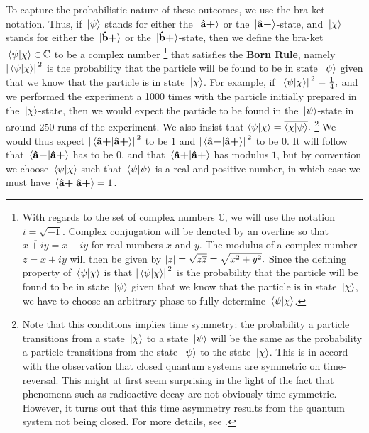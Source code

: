 \documentclass[letter, 12pt]{turabian-thesis}
\theoremstyle{hypothesis}
\newcommand{\uvb}[1]{\vb{\hat{{#1}}}}
\newcommand{\uvbp}[1]{\uvb{#1}\bm{+}}
\newcommand{\uvbm}[1]{\uvb{#1}\bm{-}}
\let\origfootnote\footnote %
\renewcommand{\footnote}[1]{%
\noindent %
\origfootnote{#1}}
\begin{document}
 To capture the probabilistic nature of these outcomes, we use the bra-ket notation. Thus, if $\ket*{\psi}$ stands for either the $\ket*{\uvbp{a}}$ or the $\ket*{\uvbm{a}}$-state, and $\ket*{\chi}$ stands for either the $\ket*{\uvbp{b}}$ or the $\ket*{\uvbp{b}}$-state, then we define the bra-ket $\ip*{\psi}{\chi}\in\mathbb{C}$ to be a complex number\footnote{With regards to the set of complex numbers $\mathbb{C}$, we will use the notation $i=\sqrt{-1}$. Complex conjugation will be denoted by an overline so that $\overline{x+iy}=x-iy$ for real numbers $x$ and $y$. The modulus of a complex number $z=x+iy$ will then be given by $\abs{z}=\sqrt{z\overline{z}}=\sqrt{x^2+y^2}.$ Since the defining property of  $\ip*{\psi}{\chi}$ is that $\abs*{\ip*{\psi}{\chi}}^2$ is the probability that the particle will be found to be in state $\ket*{\psi}$ given that we know that the particle is in state $\ket*{\chi}$, we have to choose an arbitrary phase to fully determine $\ip*{\psi}{\chi}$. } that satisfies the \textbf{Born Rule},\label{bornrule} namely $\abs*{\ip*{\psi}{\chi}}^2$ is the probability that the particle will be found to be in state $\ket*{\psi}$ given that we know that the particle is in state $\ket*{\chi}$. For example, if $\abs*{\ip*{\psi}{\chi}}^2=\frac{1}{4},$ and we performed the experiment a 1000 times with the particle initially prepared in the $\ket*{\chi}$-state, then we would expect the particle to be found in the $\ket*{\psi}$-state in around 250 runs of the experiment.   We also insist that $\ip{\psi}{\chi}=\overline{\ip{\chi}{\psi}}.$\footnote{Note that this conditions implies time symmetry: the probability a particle transitions from a state $\ket*{\chi}$ to a state $\ket*{\psi}$ will be the same as the probability a particle transitions from the state $\ket*{\psi}$ to the state $\ket*{\chi}$. This is in accord with the observation that closed quantum systems are symmetric on time-reversal. This might at first seem surprising in the light of the fact that phenomena such as radioactive decay are not obviously time-symmetric. However, it turns out that this time asymmetry results from the quantum system not being closed. For more details, see \cite{Pascazio2013}.} We would thus expect $\abs*{\ip*{\uvbp{a}}{\uvbp{a}}}^2$ to be $1$ and $\abs*{\ip*{\uvbm{a}}{\uvbp{a}}}^2$ to be $0$. It will follow that $\ip*{\uvbm{a}}{\uvbp{a}}$ has to be $0$, and that $\ip*{\uvbp{a}}{\uvbp{a}}$ has modulus $1$, but by convention we choose $\ip*{\psi}{\chi}$  such that $\ip*{\psi}{\psi}$ is a real and positive number, in which case we must have $\ip*{\uvbp{a}}{\uvbp{a}}=1$.
\end{document}
